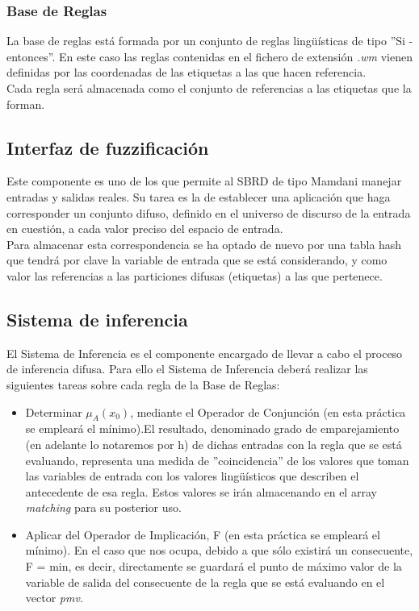 \documentclass[12pt,a4paper]{article}
\begin{document}
\subsubsection{Base de Reglas}
La base de reglas está formada por un conjunto de reglas lingüísticas de tipo ''Si - entonces''. En este caso las reglas contenidas en el fichero de extensión \textit{.wm} vienen definidas por las coordenadas de las etiquetas a las que hacen referencia.\\
Cada regla será almacenada como el conjunto de referencias a las etiquetas que la forman.

\subsection{Interfaz de fuzzificación}
Este componente es uno de los que permite al SBRD de tipo Mamdani manejar entradas y salidas reales. Su tarea es la de establecer una aplicación que haga corresponder un conjunto difuso, definido en el universo de discurso de la entrada en cuestión, a cada valor preciso del espacio de entrada.\\
Para almacenar esta correspondencia se ha optado de nuevo por una tabla hash que tendrá por clave la variable de entrada que se está considerando, y como valor las referencias a las particiones difusas (etiquetas) a las que pertenece.

\subsection{Sistema de inferencia}
El Sistema de Inferencia es el componente encargado de llevar a cabo el proceso de inferencia difusa. Para ello el Sistema de Inferencia deberá realizar las siguientes tareas sobre cada regla de la Base de Reglas:
\begin{itemize}
\item Determinar $\mu_{A}(x_{0})$, mediante el Operador de Conjunción (en esta práctica se empleará el mínimo).El resultado, denominado grado de emparejamiento (en adelante lo notaremos por h) de dichas entradas con la regla que se está evaluando, representa una medida de ''coincidencia'' de los valores que toman las variables de
entrada con los valores lingüísticos que describen el antecedente de esa regla. Estos valores se irán almacenando en el array \textit{matching} para su posterior uso.
\item Aplicar del Operador de Implicación, F (en esta práctica se empleará el mínimo). En el caso que nos ocupa, debido a que sólo existirá un consecuente, F = min, es decir, directamente se guardará el punto de máximo valor de la variable de salida del consecuente de la regla que se está evaluando en el vector \textit{pmv}.
\end{itemize}
\end{document}
